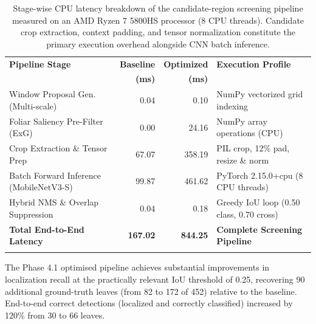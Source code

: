 \documentclass[pdflatex,sn-mathphys-num]{sn-jnl}
\theoremstyle{thmstyleone}%
\theoremstyle{thmstyletwo}%
\theoremstyle{thmstylethree}%
\begin{document}
\begin{table}[htbp]
\caption{Stage-wise CPU latency breakdown of the candidate-region screening pipeline measured on an AMD Ryzen 7 5800HS processor (8 CPU threads). Candidate crop extraction, context padding, and tensor normalization constitute the primary execution overhead alongside CNN batch inference.}\label{tab:latency_breakdown}%
\footnotesize
\setlength{\tabcolsep}{3pt}%
\begin{tabular*}{\textwidth}{@{\extracolsep\fill}>{\raggedright\arraybackslash}p{4.2cm}rr>{\raggedright\arraybackslash}p{4.2cm}}
\toprule
\textbf{Pipeline Stage} & \textbf{Baseline} & \textbf{Optimized} & \textbf{Execution Profile} \\
& \textbf{(ms)} & \textbf{(ms)} & \\
\midrule
Window Proposal Gen. (Multi-scale)       & 0.04 &   0.10 & NumPy vectorized grid indexing \\
Foliar Saliency Pre-Filter (ExG)         & 0.00 &  24.16 & NumPy array operations (CPU) \\
Crop Extraction \& Tensor Prep           & 67.07 & 358.19 & PIL crop, 12\% pad, resize \& norm \\
Batch Forward Inference (MobileNetV3-S)  & 99.87 & 461.62 & PyTorch 2.15.0+cpu (8 CPU threads) \\
Hybrid NMS \& Overlap Suppression        & 0.04 &   0.18 & Greedy IoU loop (0.50 class, 0.70 cross) \\
\midrule
\textbf{Total End-to-End Latency}        & \textbf{167.02} & \textbf{844.25} & \textbf{Complete Screening Pipeline} \\
\botrule
\end{tabular*}
\end{table}

The Phase 4.1 optimised pipeline achieves substantial improvements in localization
recall at the practically relevant IoU threshold of 0.25, recovering 90 additional
ground-truth leaves (from 82 to 172 of 452) relative to the baseline. End-to-end
correct detections (localized and correctly classified) increased by 120\% from 30 to
66 leaves.
\end{document}
